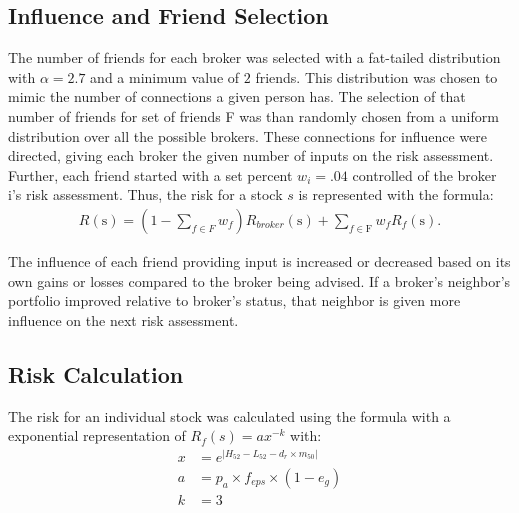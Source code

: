 \documentclass[letterpaper, 11 pt, proceedings]{IEEEtran}
\begin{document}
	\subsection{Influence and Friend Selection}\label{subsec:friends}
	The number of friends for each broker was selected with a fat-tailed distribution with $\alpha = 2.7$ and a minimum value of $2$ friends. This distribution was chosen to mimic the number of connections a given person has. The selection of that number of friends for set of friends F was than randomly chosen from a uniform distribution over all the possible brokers. These connections for influence were directed, giving each broker the given number of inputs on the risk assessment. Further, each friend started with a set percent $w_i = .04$ controlled of the broker i's risk assessment. Thus, the risk for a stock $s$ is represented with the formula:
	\begin{align}
		R(\text{s}) = (1-\sum\limits_{f\in F} w_f) R_{broker}(\text{s}) + \sum\limits_{f\in \text{F}} w_f R_f(\text{s}).\label{eq:weighted_assessment}
	\end{align}	
	
	The influence of each friend providing input is increased or decreased based on its own gains or losses compared to the broker being advised. If a broker's neighbor's portfolio improved relative to broker's status, that neighbor is given more influence on the next risk assessment.

	\subsection{Risk Calculation}\label{subsec:risk}
	The risk for an individual stock was calculated using the formula with a exponential representation of $R_f(s) = ax^{-k}$ with:
	\begin{align}
		x &= e^{|H_{52} - L_{52} - d_r \times m_{50}|} \\
		a &= p_a \times f_{eps} \times (1 - e_g)\\
		k &= 3
	\end{align}

	
\end{document}
